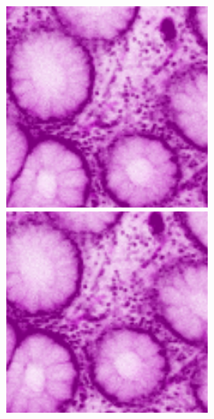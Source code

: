 \begin{figure}[H]
	\centering
	
	\begin{minipage}{0.25\columnwidth}
		\centering
		\includegraphics[clip, width=\linewidth]{fig/preprocessing/data_aug/random_crop/x0_y0}
	\end{minipage}
	\begin{minipage}{0.25\columnwidth}
		\centering
		\includegraphics[clip, width=\linewidth]{fig/preprocessing/data_aug/random_crop/x15_y15}

\end{minipage}
\end{figure}
